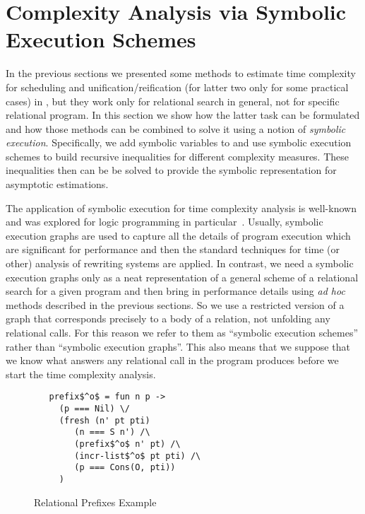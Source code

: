\section{Complexity Analysis via Symbolic Execution Schemes}
\label{sec:symbolic}

In the previous sections we presented some methods to estimate time complexity for scheduling and unification/reification (for latter two only for some practical cases) in \mK, but they work
only for relational search in general, not for specific relational program. In this section we show how the latter task can be formulated and how those methods can be combined to solve
it using a notion of \emph{symbolic execution}. Specifically, we add symbolic variables to \mK and use symbolic execution schemes to build recursive inequalities for different complexity
measures. These inequalities then can be be solved to provide the symbolic representation for asymptotic estimations.

The application of symbolic execution for time complexity analysis is well-known and was explored for logic programming in particular~\cite{SymbolicExecutionForAnalysis}.
Usually, symbolic execution graphs are used to capture all the details of program execution which are significant for performance and then the standard techniques for time (or other)
analysis of rewriting systems are applied. In contrast, we need a symbolic execution graphs only as a neat representation of a general scheme of a relational search for a
given program and then bring in performance details using \emph{ad hoc} methods described in the previous sections. So we use a restricted version of a graph that corresponds
precisely to a body of a relation, not unfolding any relational calls. For this reason we refer to them as ``symbolic execution schemes'' rather than ``symbolic execution graphs''.
This also means that we suppose that we know what answers any relational call in the program produces before we start the time complexity analysis.

\begin{figure}[t]
\begin{lstlisting}
   prefix$^o$ = fun n p ->
     (p === Nil) \/
     (fresh (n' pt pti)
        (n === S n') /\
        (prefix$^o$ n' pt) /\
        (incr-list$^o$ pt pti) /\
        (p === Cons(O, pti))
     )
\end{lstlisting}

\caption{Relational Prefixes Example}
\label{fig:prefixo_definition}
\end{figure}

